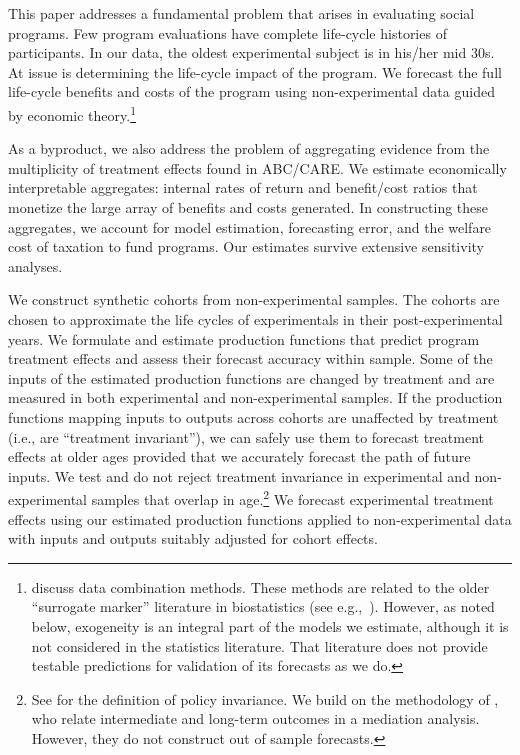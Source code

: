 This paper addresses a fundamental problem that arises in evaluating social programs. Few program evaluations have complete life-cycle histories of participants. In our data, the oldest experimental subject is in his/her mid 30s. At issue is determining the life-cycle impact of the program. We forecast the full life-cycle benefits and costs of the program using non-experimental data guided by economic theory.\footnote{\citet{Ridder_Moffitt_2007_hbk_metricsdata} discuss data combination methods. These methods are related to the older ``surrogate marker'' literature in biostatistics (see e.g.,\ \citealp{Prentice_1989_Surrogate_SiM}). However, as noted below, exogeneity is an integral part of the models we estimate, although it is not considered in the statistics literature. That literature does not provide testable predictions for validation of its forecasts as we do.}

As a byproduct, we also address the problem of aggregating evidence from the multiplicity of treatment effects found in ABC/CARE. We estimate economically interpretable aggregates: internal rates of return and benefit/cost ratios that monetize the large array of benefits and costs generated. In constructing these aggregates, we account for model estimation, forecasting error, and the welfare cost of taxation to fund programs. Our estimates survive extensive sensitivity analyses.

We construct synthetic cohorts from non-experimental samples. The cohorts are chosen to approximate the life cycles of experimentals in their post-experimental years. We formulate and estimate production functions that predict program treatment effects and assess their forecast accuracy within sample. Some of the inputs of the estimated production functions are changed by treatment and are measured in both experimental and non-experimental samples. If the production functions mapping inputs to outputs across cohorts are unaffected by treatment (i.e., are ``treatment invariant''), we can safely use them to forecast treatment effects at older ages provided that we accurately forecast the path of future inputs. We test and do not reject treatment invariance in experimental and non-experimental samples that overlap in age.\footnote{See \cite{Hurwicz_1962_structural} for the definition of policy invariance. We build on the methodology of \citet{Heckman_Pinto_etal_2013_PerryFactor}, who relate intermediate and long-term outcomes in a mediation analysis. However, they do not construct out of sample forecasts.} We forecast experimental treatment effects using our estimated production functions applied to non-experimental data with inputs and outputs suitably adjusted for cohort effects.

